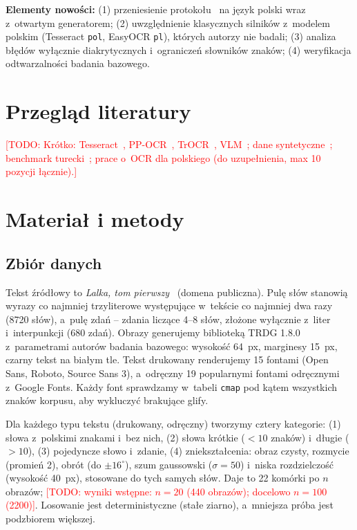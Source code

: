 \documentclass[runningheads]{llncs}
\newcommand{\TODO}[1]{\textcolor{red}{[TODO: #1]}}
\begin{document}
\textbf{Elementy nowości:}
(1) przeniesienie protokołu~\cite{yilmaz2026} na język polski wraz z~otwartym generatorem;
(2) uwzględnienie klasycznych silników z~modelem polskim (Tesseract \texttt{pol}, EasyOCR \texttt{pl}),
których autorzy nie badali;
(3) analiza błędów wyłącznie diakrytycznych i~ograniczeń słowników znaków;
(4) weryfikacja odtwarzalności badania bazowego.

\section{Przegląd literatury}

\TODO{Krótko: Tesseract~\cite{smith2007}, PP-OCR~\cite{li2022ppocrv3}, TrOCR~\cite{li2023trocr},
VLM~\cite{bai2025qwen25vl}; dane syntetyczne~\cite{jaderberg2014,trdg}; benchmark turecki~\cite{yilmaz2026};
prace o~OCR dla polskiego (do uzupełnienia, max 10 pozycji łącznie).}

\section{Materiał i metody}

\subsection{Zbiór danych}
Tekst źródłowy to \emph{Lalka, tom pierwszy}~\cite{wolnelektury} (domena publiczna). Pulę słów stanowią
wyrazy co najmniej trzyliterowe występujące w~tekście co najmniej dwa razy (8720 słów), a~pulę zdań
-- zdania liczące 4--8 słów, złożone wyłącznie z~liter i~interpunkcji (680 zdań).
Obrazy generujemy biblioteką TRDG 1.8.0~\cite{trdg} z~parametrami autorów badania bazowego: wysokość
64~px, marginesy 15~px, czarny tekst na białym tle. Tekst drukowany renderujemy 15 fontami (Open Sans,
Roboto, Source Sans 3), a~odręczny 19 popularnymi fontami odręcznymi z~Google Fonts. Każdy font
sprawdzamy w~tabeli \texttt{cmap} pod kątem wszystkich znaków korpusu, aby wykluczyć brakujące glify.

Dla każdego typu tekstu (drukowany, odręczny) tworzymy cztery kategorie:
(1) słowa z~polskimi znakami i~bez nich,
(2) słowa krótkie (${<}10$ znaków) i~długie (${>}10$),
(3) pojedyncze słowo i~zdanie,
(4) zniekształcenia: obraz czysty, rozmycie (promień 2), obrót (do $\pm16^\circ$), szum gaussowski
($\sigma=50$) i~niska rozdzielczość (wysokość 40~px), stosowane do tych samych słów.
Daje to 22 komórki po $n$ obrazów; \TODO{wyniki wstępne: $n=20$ (440 obrazów); docelowo $n=100$ (2200)}.
Losowanie jest deterministyczne (stałe ziarno), a~mniejsza próba jest podzbiorem większej.
\end{document}
